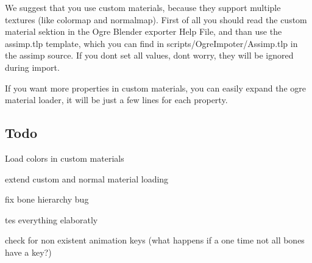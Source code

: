 We suggest that you use custom materials, because they support multiple textures (like colormap and normalmap). First of all you should read the custom material sektion in the Ogre Blender exporter Help File, and than use the assimp.\+tlp template, which you can find in scripts/\+Ogre\+Impoter/\+Assimp.\+tlp in the assimp source. If you don\textquotesingle{}t set all values, don\textquotesingle{}t worry, they will be ignored during import.

If you want more properties in custom materials, you can easily expand the ogre material loader, it will be just a few lines for each property.\hypertarget{importer_notes_todo}{}\subsection{Todo}\label{importer_notes_todo}

\begin{DoxyItemize}
\item Load colors in custom materials
\item extend custom and normal material loading
\item fix bone hierarchy bug
\item tes everything elaboratly
\item check for non existent animation keys (what happens if a one time not all bones have a key?) 
\end{DoxyItemize}